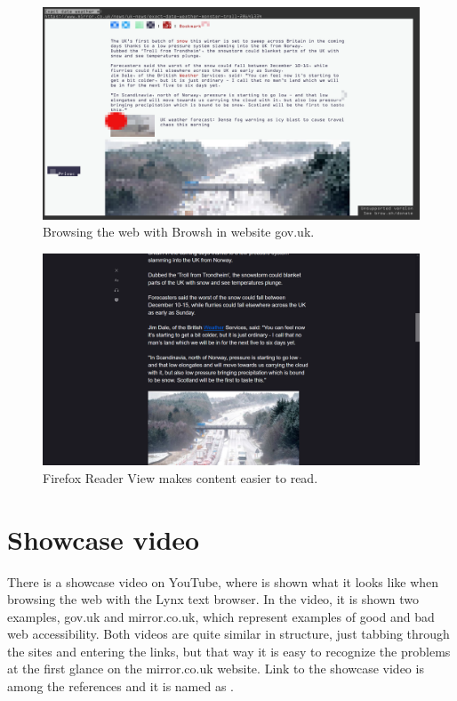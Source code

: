 \begin{figure}[tp]
\centering
\includegraphics[keepaspectratio,width=\linewidth,height=\halfh]
{images/browsh.png}

\caption[Browsh Graphical CLI Browser]
{%
Browsing the web with Browsh in website gov.uk.
}%
\label{fig:browsh}
\end{figure}


\begin{figure}[tp]
\centering
\includegraphics[keepaspectratio,width=\linewidth,height=\halfh]
{images/reader-view.png}

\caption[Firefox Reader View]
{%
Firefox Reader View makes content easier to read.
}%
\label{fig:firefox-rv}
\end{figure}


\section{Showcase video}%
\label{sec:tb-showcase}

There is a showcase video on YouTube, where is shown what it looks
like when browsing the web with the Lynx text browser. In the video, it
is shown two examples, gov.uk and mirror.co.uk, which represent 
examples of good and bad web accessibility. Both videos are quite
similar in structure, just tabbing through the sites and entering the
links, but that way it is easy to recognize the problems at the first
glance on the mirror.co.uk website. Link to the showcase video is 
among the references and it is named as \textcite{tb-showcase}.


